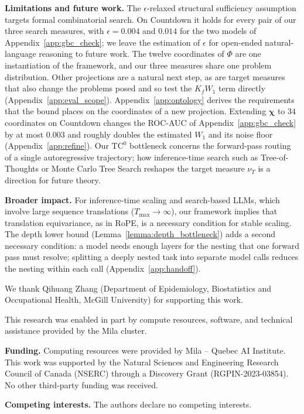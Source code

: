 \documentclass{article}
\begin{document}
\textbf{Limitations and future work.} The $\epsilon$-relaxed structural sufficiency assumption targets formal combinatorial search. On Countdown it holds for every pair of our three search measures, with $\epsilon=0.004$ and $0.014$ for the two models of Appendix~\ref{app:gbc_check}; we leave the estimation of $\epsilon$ for open-ended natural-language reasoning to future work. The twelve coordinates of $\Phi$ are one instantiation of the framework, and our three measures share one problem distribution. Other projections are a natural next step, as are target measures that also change the problems posed and so test the $K_f W_1$ term directly (Appendix~\ref{app:eval_scope}). Appendix~\ref{app:ontology} derives the requirements that the bound places on the coordinates of a new projection. Extending $\boldsymbol{\chi}$ to $34$ coordinates on Countdown changes the ROC-AUC of Appendix~\ref{app:gbc_check} by at most $0.003$ and roughly doubles the estimated $W_1$ and its noise floor (Appendix~\ref{app:refine}). Our $\text{TC}^0$ bottleneck concerns the forward-pass routing of a single autoregressive trajectory; how inference-time search such as Tree-of-Thoughts or Monte Carlo Tree Search reshapes the target measure $\nu_T$ is a direction for future theory.

\textbf{Broader impact.} For inference-time scaling and search-based LLMs, which involve large sequence translations ($T_{\max} \to \infty$), our framework implies that translation equivariance, as in RoPE, is a necessary condition for stable scaling. The depth lower bound (Lemma~\ref{lemma:depth_bottleneck}) adds a second necessary condition: a model needs enough layers for the nesting that one forward pass must resolve; splitting a deeply nested task into separate model calls reduces the nesting within each call (Appendix~\ref{app:handoff}).

\begin{ack} %
We thank Qihuang Zhang (Department of Epidemiology, Biostatistics and Occupational Health, McGill University) for supporting this work.

This research was enabled in part by compute resources, software, and technical assistance provided by the Mila cluster.

\textbf{Funding.} Computing resources were provided by Mila -- Quebec AI Institute. This work was supported by the Natural Sciences and Engineering Research Council of Canada (NSERC) through a Discovery Grant (RGPIN-2023-03854). No other third-party funding was received.

\textbf{Competing interests.} The authors declare no competing interests.
\end{ack}


   

\clearpage
\appendix



\newpage
\end{document}
